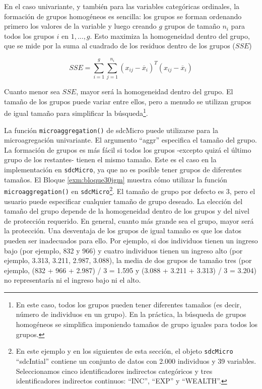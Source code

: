 \documentclass[
]{book}
\theoremstyle{definition}
\theoremstyle{definition}
\theoremstyle{definition}
\theoremstyle{definition}
\theoremstyle{remark}
\begin{document}
En el caso univariante, y también para las variables categóricas ordinales, la formación de grupos homogéneos es sencilla: los grupos se forman ordenando primero los valores de la variable y luego creando \(g\) grupos de tamaño \(n_i\) para todos los grupos \(i\) en \(1, ..., g\). Esto maximiza la homogeneidad dentro del grupo, que se mide por la suma al cuadrado de los residuos dentro de los grupos (\(SSE\))

\[
SSE = \sum_{i = 1}^{g}{\sum_{j = 1}^{n_{i}}{\left( x_{ij} - {\overline{x}}_{i} \right)^{T}\left( x_{ij} - {\overline{x}}_{i} \right)}}
\]

Cuanto menor sea \(SSE\), mayor será la homogeneidad dentro del grupo. El tamaño de los grupos puede variar entre ellos, pero a menudo se utilizan grupos de igual tamaño para simplificar la búsqueda\footnote{En este caso, todos los grupos pueden tener diferentes tamaños (es decir, número de individuos en un grupo). En la práctica, la búsqueda de grupos homogéneos se simplifica imponiendo tamaños de grupo iguales para todos los grupos.}.

La función \texttt{microaggregation()} de sdcMicro puede utilizarse para la microagregación univariante. El argumento ``aggr'' especifica el tamaño del grupo. La formación de grupos es más fácil si todos los grupos -excepto quizá el último grupo de los restantes- tienen el mismo tamaño. Este es el caso en la implementación en \texttt{sdcMicro}, ya que no es posible tener grupos de diferentes tamaños. El Bloque \ref{exm:bloque30jgm} muestra cómo utilizar la función \texttt{microaggregation()} en \texttt{sdcMicro}\footnote{En este ejemplo y en los siguientes de esta sección, el objeto \texttt{sdcMicro} ``sdcIntial'' contiene un conjunto de datos con 2.000 individuos y 39 variables. Seleccionamos cinco identificadores indirectos categóricos y tres identificadores indirectos continuos: ``INC'', ``EXP'' y ``WEALTH''.}. El tamaño de grupo por defecto es 3, pero el usuario puede especificar cualquier tamaño de grupo deseado. La elección del tamaño del grupo depende de la homogeneidad dentro de los grupos y del nivel de protección requerido. En general, cuanto más grande sea el grupo, mayor será la protección. Una desventaja de los grupos de igual tamaño es que los datos pueden ser inadecuados para ello. Por ejemplo, si dos individuos tienen un ingreso bajo (por ejemplo, 832 y 966) y cuatro individuos tienen un ingreso alto (por ejemplo, 3.313, 3.211, 2.987, 3.088), la media de dos grupos de tamaño tres (por ejemplo, (832 + 966 + 2.987) / 3 = 1.595 y (3.088 + 3.211 + 3.313) / 3 = 3.204) no representaría ni el ingreso bajo ni el alto.
\end{document}
